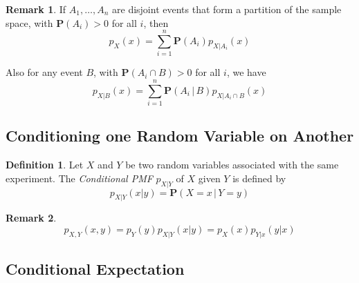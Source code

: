\documentclass{tufte-handout}
\theoremstyle{definition} \newtheorem{definition}{Definition}
\theoremstyle{definition} \newtheorem{remark}{Remark}
\newcommand{\prob}[1]{\mathbf{P} \left( #1 \right)}
\newcommand{\cprob}[2]{\mathbf{P} \left( #1 \, | \, #2 \right)}
\newcommand{\pmf}[2]{p_{#1} \left( #2 \right)}
\newcommand{\jpmf}[4]{p_{#1, #2} \left( #3, #4 \right)}
\newcommand{\cpmf}[3]{p_{#1 | #2} \left( #3 \right)}
\begin{document}
\begin{remark}
  If $A_1, \ldots, A_n$ are disjoint events that form a partition of the
  sample space, with $\prob{A_i} > 0$ for all $i$, then
  \begin{equation*}
    \pmf{X}{x} = \sum_{i = 1} ^n \prob{A_i} \cpmf{X}{A_i}{x}
  \end{equation*}

  Also for any event $B$, with $\prob{A_i \cap B} > 0$ for all $i$, we
  have
  \begin{equation*}
    \cpmf{X}{B}{x} = \sum_{i = 1} ^n \cprob{A_i}{B} \cpmf{X}{A_i \cap B}{x}
  \end{equation*}
\end{remark}

\subsection{Conditioning one Random Variable on Another}

\begin{definition}
  Let $X$ and $Y$ be two random variables associated with the same
  experiment. The \emph{Conditional PMF} $p_{X|Y}$ of $X$ given $Y$ is
  defined by
  \begin{equation*}
    \cpmf{X}{Y}{x|y} = \prob{X = x \, | \, Y = y}
  \end{equation*}
\end{definition}

\begin{remark}
  \begin{equation*}
    \jpmf{X}{Y}{x}{y} = \pmf{Y}{y} \cpmf{X}{Y}{x|y}
    = \pmf{X}{x} \cpmf{Y}{x}{y|x}
  \end{equation*}
\end{remark}

\subsection{Conditional Expectation}
\end{document}
